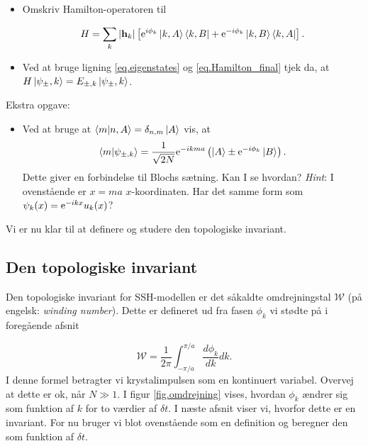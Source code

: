 \documentclass[11pt, a4paper]{article}
\def\te{{\rm e}}
\begin{document}
\begin{itemize}
	\item Omskriv Hamilton-operatoren til
	
	\begin{equation}
	H = \sum_k |\mathbf{h}_k|\left[\te^{i\phi_k}\ket{k, A}\bra{k, B} + \te^{-i\phi_k}\ket{k, B}\bra{k, A}\right].
	\label{eq.Hamilton_final}
	\end{equation}

	\item Ved at bruge ligning \eqref{eq.eigenstates} og \eqref{eq.Hamilton_final} tjek da, at $H\ket{\psi_\pm, k} = E_{\pm, k}\ket{\psi_\pm, k}$. 

\end{itemize}

Ekstra opgave:

\begin{itemize}
	\item Ved at bruge at $\braket{m | n, A} = \delta_{n, m} \ket{A}$ vis, at 
	\begin{equation}
	\braket{m| \psi_{\pm, k}} = \frac{1}{\sqrt{2N}}\te^{-ikma}\left(\ket{A} \pm \te^{-i\phi_k}\ket{B}\right). 
	\end{equation}
	Dette giver en forbindelse til Blochs sætning. Kan I se hvordan? \textit{Hint}: I ovenstående er $x = ma$ $x$-koordinaten. Har det samme form som $\psi_k(x) = \te^{-ikx} u_k(x)$?
\end{itemize}
Vi er nu klar til at definere og studere den topologiske invariant. 

\subsection{Den topologiske invariant}
Den topologiske invariant for SSH-modellen er det såkaldte omdrejningstal $\mathcal{W}$ (på engelsk: \textit{winding number}). Dette er defineret ud fra fasen $\phi_k$ vi stødte på i foregående afsnit

\begin{equation}
\mathcal{W} = \frac{1}{2\pi} \int_{-\pi / a}^{\pi / a} \frac{d\phi_k}{dk} dk. 
\label{eq.definition_omdrejningstal}
\end{equation}
I denne formel betragter vi krystalimpulsen som en kontinuert variabel. Overvej at dette er ok, når $N \gg 1$. I figur \ref{fig.omdrejning} vises, hvordan $\phi_k$ ændrer sig som funktion af $k$ for to værdier af $\delta t$. I næste afsnit viser vi, hvorfor dette er en invariant. For nu bruger vi blot ovenstående som en definition og beregner den som funktion af $\delta t$. 
\end{document}
